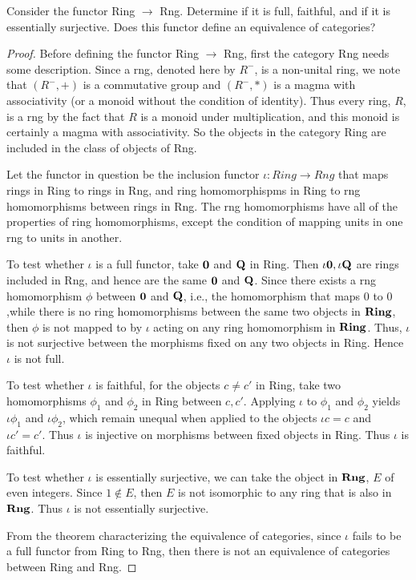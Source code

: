 \documentclass[main.tex]{subfiles}
\begin{document}
\begin{lemma}
	Consider the functor Ring $\rightarrow$ Rng. Determine if it is full, faithful, and if it is essentially surjective. Does this functor define an equivalence of categories?

\end{lemma}


\begin{proof}
	Before defining the functor Ring $\rightarrow$ Rng, first the category Rng needs some description. Since a rng, denoted here by $R^-$, is a non-unital ring, we note that $(R^-,+)$ is a commutative group and $(R^-,*)$ is a magma with associativity (or a monoid without the condition of identity). Thus every ring, $R$, is a rng by the fact that $R$ is a monoid under multiplication, and this monoid is certainly a magma with associativity. So the objects in the category Ring are included in the class of objects of Rng. 

	Let the functor in question be the inclusion functor $\iota: Ring\rightarrow Rng$ that maps rings in Ring to rings in Rng, and ring homomorphispms in Ring to rng homomorphisms between rings in Rng. The rng homomorphisms have all of the properties of ring homomorphisms, except the condition of mapping units in one rng to units in another. 

	To test whether $\iota$ is a full functor, take $\bold 0$ and  $\bold Q$ in Ring. Then $\iota \bold 0, \iota \bold Q$ are rings included in Rng, and hence are the same $\bold 0$ and  $\bold Q$. Since there exists a rng homomorphism $\phi$ between $\bold 0$ and $\bold Q$, i.e., the homomorphism that maps $0$ to $0$,while there is no ring homomorphisms between the same two objects in $\bold {Ring}$, then $\phi$ is not mapped to by $\iota$ acting on any ring homomorphism in $\bold {Ring}$.  Thus, $\iota$ is not surjective between the morphisms fixed on any two objects in Ring. Hence $\iota$ is not full.

	To test whether $\iota$ is faithful, for the objects $c \not= c'$ in Ring, take two homomorphisms $\phi_1$ and $\phi_2$ in Ring between $c, c'$. Applying $\iota$ to $\phi_1$ and $\phi_2$ yields $\iota \phi_1$ and $\iota \phi_2$, which remain unequal when applied to the objects $\iota c = c$ and $\iota c' = c'$. Thus $\iota$ is injective on morphisms between fixed objects in Ring. Thus $\iota$ is faithful.

	To test whether $\iota$ is essentially surjective, we can take the object in $\bold {Rng}$, $E$ of even integers. Since $1 \notin E$, then $E$ is not isomorphic to any ring that is also in $\bold {Rng}$. Thus $\iota$ is not essentially surjective.

	From the theorem characterizing the equivalence of categories, since $\iota$ fails to be a full functor from Ring to Rng, then there is not an equivalence of categories between Ring and Rng. 


\end{proof}	
\end{document}
